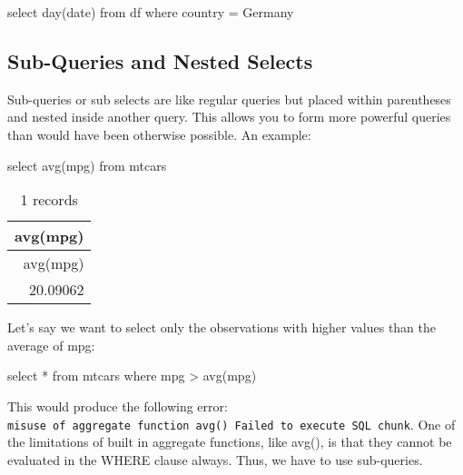 \documentclass[
  letterpaper,
  DIV=11,
  numbers=noendperiod]{scrreprt}
\newenvironment{Shaded}{\begin{snugshade}}{\end{snugshade}}
\newcommand{\DataTypeTok}[1]{\textcolor[rgb]{0.68,0.00,0.00}{#1}}
\newcommand{\FunctionTok}[1]{\textcolor[rgb]{0.28,0.35,0.67}{#1}}
\newcommand{\KeywordTok}[1]{\textcolor[rgb]{0.00,0.23,0.31}{#1}}
\newcommand{\NormalTok}[1]{\textcolor[rgb]{0.00,0.23,0.31}{#1}}
\newcommand{\OperatorTok}[1]{\textcolor[rgb]{0.37,0.37,0.37}{#1}}
\newcommand{\StringTok}[1]{\textcolor[rgb]{0.13,0.47,0.30}{#1}}
\begin{document}
\begin{Shaded}
\begin{Highlighting}[]
\KeywordTok{select} \DataTypeTok{day}\NormalTok{(}\DataTypeTok{date}\NormalTok{) }\KeywordTok{from}\NormalTok{ df }\KeywordTok{where}\NormalTok{ country }\OperatorTok{=} \StringTok{\textquotesingle{}Germany\textquotesingle{}}
\end{Highlighting}
\end{Shaded}

\hypertarget{sub-queries-and-nested-selects}{%
\subsection{Sub-Queries and Nested
Selects}\label{sub-queries-and-nested-selects}}

Sub-queries or sub selects are like regular queries but placed within
parentheses and nested inside another query. This allows you to form
more powerful queries than would have been otherwise possible. An
example:

\begin{Shaded}
\begin{Highlighting}[]
\KeywordTok{select} \FunctionTok{avg}\NormalTok{(mpg) }\KeywordTok{from}\NormalTok{ mtcars}
\end{Highlighting}
\end{Shaded}

\begin{longtable}[]{@{}r@{}}
\caption{1 records}\tabularnewline
\toprule()
avg(mpg) \\
\midrule()
\endfirsthead
\toprule()
avg(mpg) \\
\midrule()
\endhead
20.09062 \\
\bottomrule()
\end{longtable}

Let's say we want to select only the observations with higher values
than the average of mpg:

\begin{Shaded}
\begin{Highlighting}[]
\KeywordTok{select} \OperatorTok{*} \KeywordTok{from}\NormalTok{ mtcars }\KeywordTok{where}\NormalTok{ mpg }\OperatorTok{\textgreater{}} \FunctionTok{avg}\NormalTok{(mpg)}
\end{Highlighting}
\end{Shaded}

This would produce the following error:
\texttt{misuse\ of\ aggregate\ function\ avg()\ Failed\ to\ execute\ SQL\ chunk}.
One of the limitations of built in aggregate functions, like avg(), is
that they cannot be evaluated in the WHERE clause always. Thus, we have
to use sub-queries.
\end{document}
